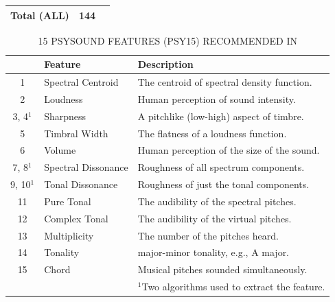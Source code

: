 \documentclass[journal, twoside]{IEEEtran}
\begin{document}
\begin{table}[ht]
\begin{tabular}{ccl}
Total (ALL)                                                                & 144                                                         &                                                                                                                                                                             \\ \hline
\end{tabular}
    
\end{table}


\vspace{.5cm}
\begin{table}[ht]
    \centering
        \caption{15 PSYSOUND FEATURES (PSY15) RECOMMENDED IN \cite{8}}
        \label{table3}
    
    \begin{tabular}{cll}
\hline
\multicolumn{1}{l}{} & Feature             & Description                                \\ \hline
1                    & Spectral Centroid   & The centroid of spectral density function. \\
2                    & Loudness            & Human perception of sound intensity.       \\
3, 4\(^1\)            & Sharpness           & A pitchlike (low-high) aspect of timbre.   \\
5                    & Timbral Width       & The flatness of a loudness function.       \\
6                    & Volume              & Human perception of the size of the sound. \\
7, 8\(^1\)          & Spectral Dissonance & Roughness of all spectrum components.      \\
9, 10\(^1\)         & Tonal Dissonance    & Roughness of just the tonal components.    \\
11                   & Pure Tonal          & The audibility of the spectral pitches.    \\
12                   & Complex Tonal       & The audibility of the virtual pitches.     \\
13                   & Multiplicity        & The number of the pitches heard.           \\
14                   & Tonality            & major-minor tonality, e.g., A major.       \\
15                   & Chord               & Musical pitches sounded simultaneously. \\
\hline \hline
 & & \(^1\)Two algorithms used to extract the feature.
\end{tabular}
    
\end{table}
\egroup
\end{document}
